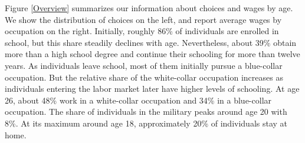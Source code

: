 \noindent Figure \ref{Overview} summarizes our information about choices and wages by age. We show the distribution of choices on the left, and report average wages by occupation on the right. Initially, roughly 86\% of individuals are enrolled in school, but this share steadily declines with age. Nevertheless, about 39\% obtain more than a high school degree and continue their schooling for more than twelve years. As individuals leave school, most of them initially pursue a blue-collar occupation. But the relative share of the white-collar occupation increases as individuals entering the labor market later have higher levels of schooling. At age 26, about 48\% work in a white-collar occupation and 34\% in a blue-collar occupation. The share of individuals in the military peaks around age 20 with 8\%. At its maximum around age 18, approximately 20\% of individuals stay at home.
%
